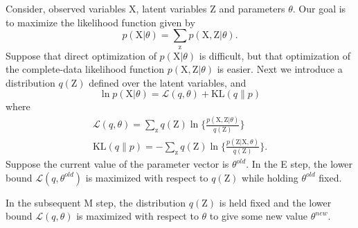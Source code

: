 \documentclass[a4paper]{book}
\newcommand{\mrm}{\mathrm}
\begin{document}
Consider, observed variables $\mrm X$, latent variables $\mrm Z$ and parameters $\theta$. Our goal is to maximize the likelihood function given by 
\begin{equation}\label{}
  p(\mrm X|\theta)=\sum_{\mrm z}p(\mrm X,\mrm Z|\theta).
\end{equation}
Suppose that direct optimization of $p(\mrm X|\theta)$ is difficult, but that optimization of the complete-data likelihood function $p(\mrm X,\mrm Z|\theta)$ is easier. Next we introduce a distribution $q(\mrm Z)$ defined over the latent variables, and 
\begin{equation}\label{}
  \ln p(\mrm X|\theta) = \mathcal L(q,\theta)+\mrm{KL}(q\|p)
\end{equation} 
where 
\begin{gather}\label{}
  \mathcal L(q,\theta) = \sum_{\mrm z}q(\mrm Z)\ln\{\frac{p(\mrm X,\mrm Z|\theta)}{q(\mrm Z)}\} \\
  \mrm {KL}(q\|p)=-\sum_{\mrm z}q(\mrm Z)\ln\{\frac{p(\mrm Z|\mrm X,\theta)}{q(\mrm Z)}\}.
\end{gather}
 Suppose the current value of the parameter vector is $\theta^{old}$. In the E step, the lower bound $\mathcal L(q,\theta^{old})$ is maximized with respect to $q(\mrm Z)$ while holding $\theta^{old}$ fixed. 
 
 In the subsequent M step, the distribution $q(\mrm Z)$ is held fixed and the lower bound $\mathcal L(q, \theta)$ is maximized with respect to $\theta$ to give some new value $\theta^{new}$. 
 
\end{document}
